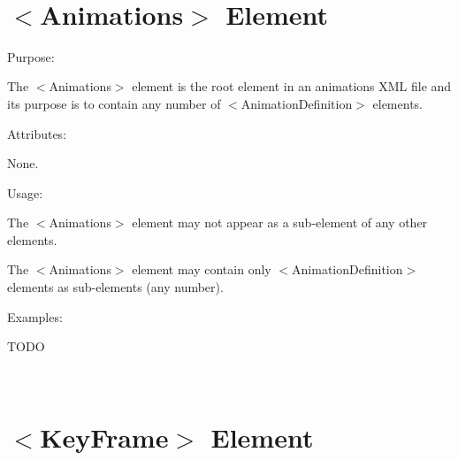 ~\newline
 \hypertarget{xml_animation_xml_animation_animations}{}\section{$<$\+Animations$>$ Element}\label{xml_animation_xml_animation_animations}

\begin{DoxyItemize}
\item Purpose\+:
\begin{DoxyItemize}
\item The $<$Animations$>$ element is the root element in an animations X\+ML file and it\textquotesingle{}s purpose is to contain any number of $<$Animation\+Definition$>$ elements.
\end{DoxyItemize}
\item Attributes\+:
\begin{DoxyItemize}
\item None.
\end{DoxyItemize}
\item Usage\+:
\begin{DoxyItemize}
\item The $<$Animations$>$ element may not appear as a sub-\/element of any other elements.
\item The $<$Animations$>$ element may contain only $<$Animation\+Definition$>$ elements as sub-\/elements (any number).
\end{DoxyItemize}
\item Examples\+:
\begin{DoxyItemize}
\item T\+O\+DO
\end{DoxyItemize}
\end{DoxyItemize}

~\newline
 \hypertarget{xml_animation_xml_animation_keyframe}{}\section{$<$\+Key\+Frame$>$ Element}\label{xml_animation_xml_animation_keyframe}

